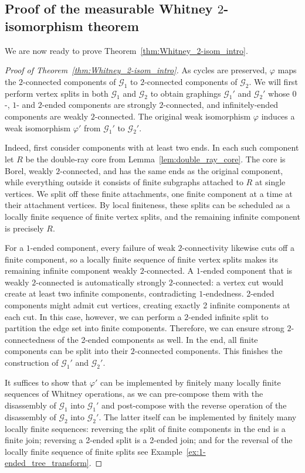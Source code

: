 \documentclass{article}
\theoremstyle{plain}
\theoremstyle{definition}
\newcommand{\cG}{\mathcal{G}}
\begin{document}
\subsection{Proof of the measurable Whitney $2$-isomorphism theorem}

We are now ready to prove Theorem~\ref{thm:Whitney_2-isom_intro}.

\begin{proof}[Proof of Theorem~\ref{thm:Whitney_2-isom_intro}]
    As cycles are preserved, $\varphi$ maps the $2$-connected components of $\cG_1$ to $2$-connected components of $\cG_2$. We will first perform vertex splits in both $\cG_1$ and $\cG_2$ to obtain graphings $\cG_1'$ and $\cG_2'$ whose $0$-, $1$- and $2$-ended components are strongly $2$-connected, and infinitely-ended components are weakly $2$-connected. The original weak isomorphism $\varphi$ induces a weak isomorphism $\varphi'$ from $\cG_1'$ to $\cG_2'$. 

    Indeed, first consider components with at least two ends. In each such component let $R$ be the double-ray core from Lemma~\ref{lem:double_ray_core}. The core is Borel, weakly $2$-connected, and has the same ends as the original component, while everything outside it consists of finite subgraphs attached to $R$ at single vertices. We split off these finite attachments, one finite component at a time at their attachment vertices. By local finiteness, these splits can be scheduled as a locally finite sequence of finite vertex splits, and the remaining infinite component is precisely $R$.

    For a $1$-ended component, every failure of weak $2$-connectivity likewise cuts off a finite component, so a locally finite sequence of finite vertex splits makes its remaining infinite component weakly $2$-connected. A $1$-ended component that is weakly $2$-connected is automatically strongly $2$-connected: a vertex cut would create at least two infinite components, contradicting $1$-endedness. 2-ended components might admit cut vertices, creating exactly 2 infinite components at each cut. In this case, however, we can perform a $2$-ended infinite split to partition the edge set into finite components. Therefore, we can ensure strong $2$-connectedness of the 2-ended components as well. In the end, all finite components can be split into their $2$-connected components. This finishes the construction of $\cG_1'$ and $\cG_2'$.

    It suffices to show that $\varphi'$ can be implemented by finitely many locally finite sequences of Whitney operations, as we can pre-compose them with the disassembly of $\cG_1$ into $\cG_1'$ and post-compose with the reverse operation of the disassembly of $\cG_2$ into $\cG_2'$. The latter itself can be implemented by finitely many locally finite sequences: reversing the split of finite components in the end is a finite join; reversing a 2-ended split is a 2-ended join; and for the reversal of the locally finite sequence of finite splits see Example~\ref{ex:1-ended_tree_transform}.


\end{proof}
\end{document}
